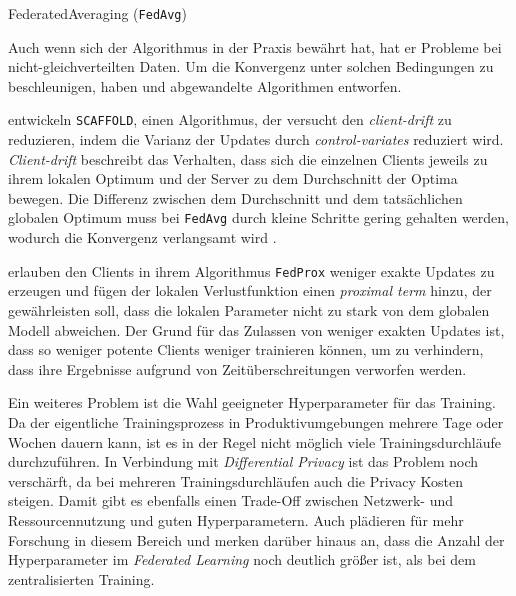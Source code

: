 \begin{algorithm}[tb]
	\caption{FederatedAveraging (\texttt{FedAvg})}
	\label{alg:fedavg}
\end{algorithm}

Auch wenn sich der Algorithmus in der Praxis bewährt hat\cite{hard:2018, ramaswamy:2020}, hat er Probleme bei nicht-gleichverteilten Daten. Um die Konvergenz unter solchen Bedingungen zu beschleunigen, haben \textcite{karimireddy:2020} und \textcite{li:2020} abgewandelte Algorithmen entworfen.

\textcite{karimireddy:2020} entwickeln \texttt{SCAFFOLD}, einen Algorithmus, der versucht den \textit{client-drift} zu reduzieren, indem die Varianz der Updates durch \textit{control-variates} reduziert wird. \textit{Client-drift} beschreibt das Verhalten, dass sich die einzelnen Clients jeweils zu ihrem lokalen Optimum und der Server zu dem Durchschnitt der Optima bewegen. Die Differenz zwischen dem Durchschnitt und dem tatsächlichen globalen Optimum muss bei \texttt{FedAvg} durch kleine Schritte gering gehalten werden, wodurch die Konvergenz verlangsamt wird \parencite[p.4]{karimireddy:2020}.

\textcite{li:2020} erlauben den Clients in ihrem Algorithmus \texttt{FedProx} weniger exakte Updates zu erzeugen und fügen der lokalen Verlustfunktion einen \textit{proximal term} hinzu, der gewährleisten soll, dass die lokalen Parameter nicht zu stark von dem globalen Modell abweichen. Der Grund für das Zulassen von weniger exakten Updates ist, dass so weniger potente Clients weniger trainieren können, um zu verhindern, dass ihre Ergebnisse aufgrund von Zeitüberschreitungen verworfen werden.

Ein weiteres Problem ist die Wahl geeigneter Hyperparameter für das Training. Da der eigentliche Trainingsprozess in Produktivumgebungen mehrere Tage\cite[p.5]{hard:2018} oder Wochen\cite[p.4]{ramaswamy:2020} dauern kann, ist es in der Regel nicht möglich viele Trainingsdurchläufe durchzuführen. In Verbindung mit \textit{Differential Privacy} ist das Problem noch verschärft, da bei mehreren Trainingsdurchläufen auch die Privacy Kosten steigen. Damit gibt es ebenfalls einen Trade-Off zwischen Netzwerk- und Ressourcennutzung und guten Hyperparametern. Auch \textcite[p.31]{kairouz:2021} plädieren für mehr Forschung in diesem Bereich und merken darüber hinaus an, dass die Anzahl der Hyperparameter im \textit{Federated Learning} noch deutlich größer ist, als bei dem zentralisierten Training.

